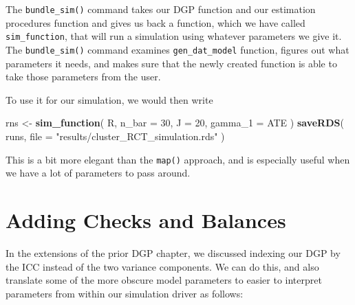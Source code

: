 \documentclass[
]{book}
\newenvironment{Shaded}{\begin{snugshade}}{\end{snugshade}}
\newcommand{\AttributeTok}[1]{\textcolor[rgb]{0.13,0.29,0.53}{#1}}
\newcommand{\DecValTok}[1]{\textcolor[rgb]{0.00,0.00,0.81}{#1}}
\newcommand{\FunctionTok}[1]{\textcolor[rgb]{0.13,0.29,0.53}{\textbf{#1}}}
\newcommand{\NormalTok}[1]{#1}
\newcommand{\OtherTok}[1]{\textcolor[rgb]{0.56,0.35,0.01}{#1}}
\newcommand{\StringTok}[1]{\textcolor[rgb]{0.31,0.60,0.02}{#1}}
\begin{document}
The \texttt{bundle\_sim()} command takes our DGP function and our estimation procedures function and gives us back a function, which we have called \texttt{sim\_function}, that will run a simulation using whatever parameters we give it.
The \texttt{bundle\_sim()} command examines \texttt{gen\_dat\_model} function, figures out what parameters it needs, and makes sure that the newly created function is able to take those parameters from the user.

To use it for our simulation, we would then write

\begin{Shaded}
\begin{Highlighting}[]
\NormalTok{rns }\OtherTok{\textless{}{-}} \FunctionTok{sim\_function}\NormalTok{( R, }\AttributeTok{n\_bar =} \DecValTok{30}\NormalTok{, }\AttributeTok{J =} \DecValTok{20}\NormalTok{, }\AttributeTok{gamma\_1 =}\NormalTok{ ATE )}
\FunctionTok{saveRDS}\NormalTok{( runs, }\AttributeTok{file =} \StringTok{"results/cluster\_RCT\_simulation.rds"}\NormalTok{ )}
\end{Highlighting}
\end{Shaded}

This is a bit more elegant than the \texttt{map()} approach, and is especially useful when we have a lot of parameters to pass around.

\section{Adding Checks and Balances}\label{adding-checks-and-balances}

In the extensions of the prior DGP chapter, we discussed indexing our DGP by the ICC instead of the two variance components.
We can do this, and also translate some of the more obscure model parameters to easier to interpret parameters from within our simulation driver as follows:
\end{document}
